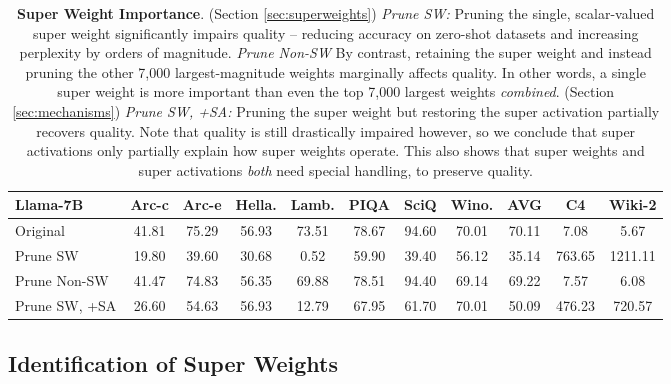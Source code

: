 \documentclass{article} %
\begin{document}
\begin{table}[t]
\small
\centering
\begin{tabular}{@{}l|ccccccc|c|cc@{}}
\toprule
\textbf{Llama-7B} & \textbf{Arc-c} & \textbf{Arc-e} & \textbf{Hella.} & \textbf{Lamb.} & \textbf{PIQA} & \textbf{SciQ} & \textbf{Wino.} & \textbf{AVG} & \textbf{C4} & \textbf{Wiki-2} \\
\midrule
{\scriptsize Original}    & 41.81  & 75.29  & 56.93    & 73.51   & 78.67 & 94.60 & 70.01 & 70.11 & 7.08 & 5.67   \\
{\scriptsize Prune SW}       & 19.80  & 39.60  & 30.68    & 0.52    & 59.90 & 39.40 & 56.12 & 35.14 & 763.65 & 1211.11 \\

{\scriptsize Prune Non-SW} & 41.47  & 74.83  & 56.35    & 69.88   & 78.51 & 94.40 & 69.14 & 69.22 & 7.57 & 6.08   \\
\midrule
{\scriptsize Prune SW, +SA}    & 26.60  & 54.63  & 56.93    & 12.79   & 67.95 & 61.70 & 70.01 & 50.09 & 476.23 & 720.57 \\
\bottomrule
\end{tabular}


\caption{\textbf{Super Weight Importance}. (Section \ref{sec:superweights}) \textit{Prune SW:} Pruning the single, scalar-valued super weight significantly impairs quality -- reducing accuracy on zero-shot datasets and increasing perplexity by orders of magnitude. \textit{Prune Non-SW} By contrast, retaining the super weight and instead pruning the other 7,000 largest-magnitude weights marginally affects quality. In other words, a single super weight is more important than even the top 7,000 largest weights \textit{combined}. (Section \ref{sec:mechanisms}) \textit{Prune SW, +SA:} Pruning the super weight but restoring the super activation partially recovers quality. Note that quality is still drastically impaired however, so we conclude that super activations only partially explain how super weights operate. This also shows that super weights and super activations \textit{both} need special handling, to preserve quality.}
\label{tab:importance_super_weight}


\end{table}



\subsection{Identification of Super Weights} 
\label{sec:sw_identification}
\end{document}

